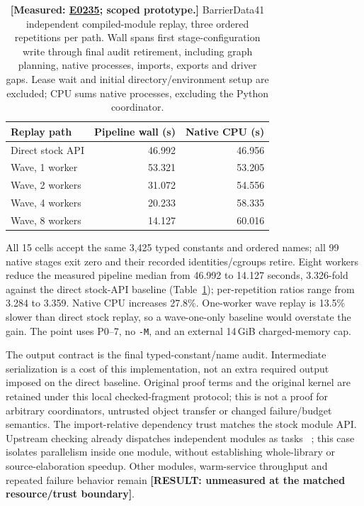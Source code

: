 \documentclass[10pt,twocolumn]{article}
\newcommand{\missing}[1]{\textbf{[RESULT: #1]}}
\newcommand{\measured}[1]{\textbf{[Measured: #1]}}
\newcommand{\expref}[2]{\href{https://github.com/yunwei37/proofserve/blob/main/docs/tmp/build-and-evaluate/step-#1/step-report.md}{E#2}}
\begin{document}
\begin{table}[t]
\centering\small
\begin{tabular}{lrr}
\toprule
Replay path & Pipeline wall (s) & Native CPU (s)\\
\midrule
Direct stock API &46.992&46.956\\
Wave, 1 worker &53.321&53.205\\
Wave, 2 workers &31.072&54.556\\
Wave, 4 workers &20.233&58.335\\
Wave, 8 workers &14.127&60.016\\
\bottomrule
\end{tabular}
\caption{\measured{\expref{0235-20261101T041713+0000}{0235}; scoped prototype.} BarrierData41 independent compiled-module replay, three ordered
repetitions per path. Wall spans first stage-configuration write through
final audit retirement, including graph planning, native processes, imports,
exports and driver gaps. Lease wait and initial directory/environment setup
are excluded; CPU sums native processes, excluding the Python coordinator.}
\label{tab:waves}
\end{table}

All 15 cells accept the same 3,425 typed constants and ordered names;
all 99 native stages exit zero and their recorded identities/cgroups retire.
Eight workers reduce the measured pipeline median from 46.992 to 14.127
seconds, 3.326-fold against the direct stock-API baseline
(Table~\ref{tab:waves}); per-repetition ratios range from 3.284 to 3.359.
Native CPU increases 27.8\%.
One-worker wave replay is 13.5\% slower than direct stock replay, so a
wave-one-only baseline would overstate the gain.
The point uses P0--7, no \texttt{-M}, and an external 14\,GiB charged-memory cap.

The output contract is the final typed-constant/name audit.
Intermediate serialization is a cost of this implementation, not an extra
required output imposed on the direct baseline.
Original proof terms and the original kernel are retained under this local
checked-fragment protocol; this is not a proof for arbitrary coordinators,
untrusted object transfer or changed failure/budget semantics.
The import-relative dependency trust matches the stock module API.
Upstream checking already dispatches independent modules as tasks
~\cite{lean434CheckerSource2026}; this case isolates parallelism inside one
module, without establishing whole-library or source-elaboration speedup.
Other modules, warm-service throughput and repeated failure behavior remain
\missing{unmeasured at the matched resource/trust boundary}.
\end{document}
